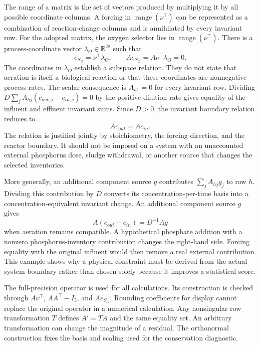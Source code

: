 The range of a matrix is the set of vectors produced by multiplying it by all possible coordinate columns. A forcing in $\operatorname{range}(\nu^\top)$ can be represented as a combination of reaction-change columns and is annihilated by every invariant row. For the adopted matrix, the oxygen selector lies in $\operatorname{range}(\nu^\top)$. There is a process-coordinate vector $\lambda_O\in\mathbb{R}^{28}$ such that
\begin{equation}
e_{S_O}=\nu^\top\lambda_O,\qquad
Ae_{S_O}=A\nu^\top\lambda_O=0.
\label{eq:oxygen_forcing_compatibility}
\end{equation}
The coordinates in $\lambda_O$ establish a subspace relation. They do not state that aeration is itself a biological reaction or that these coordinates are nonnegative process rates. The scalar consequence is $A_{h1}=0$ for every invariant row. Dividing $D\sum_j A_{hj}(c_{out,j}-c_{in,j})=0$ by the positive dilution rate gives equality of the influent and effluent invariant sums. Since $D>0$, the invariant boundary relation reduces to
\begin{equation}
Ac_{out}=Ac_{in}.
\label{eq:reactor_invariant_equality}
\end{equation}
The relation is justified jointly by stoichiometry, the forcing direction, and the reactor boundary. It should not be imposed on a system with an unaccounted external phosphorus dose, sludge withdrawal, or another source that changes the selected inventories.

More generally, an additional component source $g$ contributes $\sum_jA_{hj}g_j$ to row $h$. Dividing this contribution by $D$ converts its concentration-per-time basis into a concentration-equivalent invariant change. An additional component source $g$ gives
\begin{equation}
A(c_{out}-c_{in})=D^{-1}Ag
\label{eq:general_invariant_source}
\end{equation}
when aeration remains compatible. A hypothetical phosphate addition with a nonzero phosphorus-inventory contribution changes the right-hand side. Forcing equality with the original influent would then remove a real external contribution. This example shows why a physical constraint must be derived from the actual system boundary rather than chosen solely because it improves a statistical score.

The full-precision operator is used for all calculations. Its construction is checked through $A\nu^\top$, $AA^\top-I_5$, and $Ae_{S_O}$. Rounding coefficients for display cannot replace the original operator in a numerical calculation. Any nonsingular row transformation $T$ defines $A'=TA$ and the same equality set. An arbitrary transformation can change the magnitude of a residual. The orthonormal construction fixes the basis and scaling used for the conservation diagnostic.

